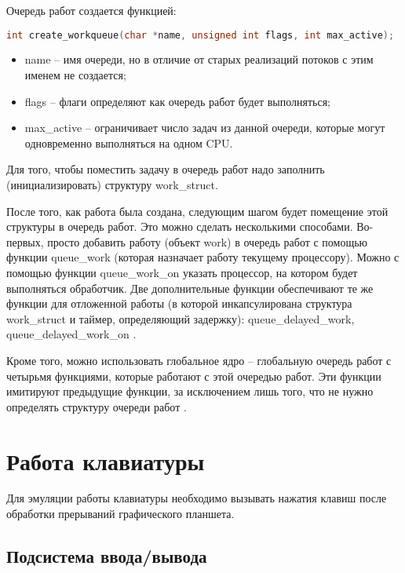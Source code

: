 Очередь работ создается функцией:

\begin{lstlisting}[language=c]
int create_workqueue(char *name, unsigned int flags, int max_active);
\end{lstlisting}

\begin{itemize}
    \item name -- имя очереди, но в отличие от старых реализаций потоков с этим именем не создается;
    \item flags -- флаги определяют как очередь работ будет выполняться;
    \item max\_active -- ограничивает число задач из данной очереди, которые могут одновременно выполняться на одном CPU.
\end{itemize}

Для того, чтобы поместить задачу в очередь работ надо заполнить (инициализировать) структуру work\_struct.

После того, как работа была создана, следующим шагом будет помещение этой структуры в очередь работ. Это можно сделать несколькими способами. Во-первых, просто добавить работу (объект work) в очередь работ с помощью функции queue\_work (которая назначает работу текущему процессору). Можно с помощью функции queue\_work\_on указать процессор, на котором будет выполняться обработчик.
Две дополнительные функции обеспечивают те же функции для отложенной работы (в которой инкапсулирована структура work\_struct и таймер, определяющий задержку): queue\_delayed\_work, queue\_delayed\_work\_on \cite{WorkQueue}.

Кроме того, можно использовать глобальное ядро -- глобальную очередь работ с четырьмя функциями, которые работают с этой очередью работ. Эти функции имитируют предыдущие функции, за исключением лишь того, что не нужно определять структуру очереди работ \cite{WorkQueue}.

\section{Работа клавиатуры}

Для эмуляции работы клавиатуры необходимо вызывать нажатия клавиш после обработки прерываний графического планшета.

\subsection{Подсистема ввода/вывода}

